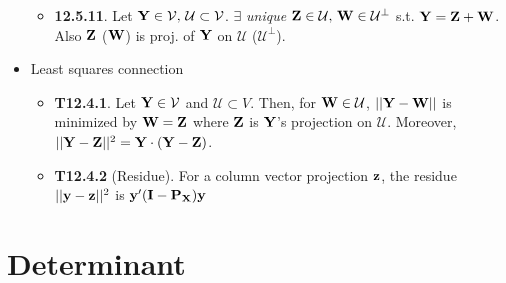 \documentclass[a4paper, oneside]{book}
\begin{document}
\begin{itemize}
\begin{itemize}
	\item \textbf{12.5.11}. Let $\mathbf{Y} \in \mathcal{V},\,\mathcal{U}\subset\mathcal{V}$. $\exists$ \textit{unique} $\mathbf{Z}\in \mathcal{U},\,\mathbf{W}\in\mathcal{U}^\perp$ s.t. $\mathbf{Y}=\mathbf{Z+W}$. Also $\mathbf{Z}$ ($\mathbf{W}$) is proj. of $\mathbf{Y}$ on $\mathcal{U}$ ($\mathcal{U}^\perp$).
	\end{itemize}
\item Least squares connection
	\begin{itemize}
	\item \textbf{T12.4.1}. Let $\mathbf{Y} \in \mathcal{V}$ and $\mathcal{U}\subset V$. Then, for $\mathbf{W}\in\mathcal{U}$, $||\mathbf{Y-W}||$ is minimized by $\mathbf{W}=\mathbf{Z}$ where $\mathbf{Z}$ is $\mathbf{Y}$'s projection on $\mathcal{U}$. Moreover, $||\mathbf{Y-Z}||^2=\mathbf{Y\cdot(Y-Z)}$.
	\item \textbf{T12.4.2} (Residue). For a column vector projection $\mathbf{z}$, the residue $||\mathbf{y}-\mathbf{z}||^2$ is $\mathbf{y}'(\mathbf{I-\mathbf{P}_\mathbf{X}})\mathbf{y}$
	\end{itemize}
\end{itemize}





















\chapter{Determinant}
\end{document}
